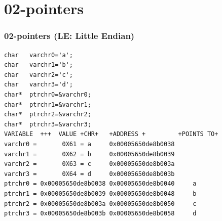 \documentclass[xcolor=table, notheorems, hyperref={pdfpagelabels=false}]{beamer}
\begin{document}
\section{02-pointers}
\begin{frame}[fragile]
\frametitle{02-pointers (LE: Little Endian)}
\begin{lstlisting}[basicstyle=\ttfamily\footnotesize]
char   varchr0='a';
char   varchr1='b';
char   varchr2='c';
char   varchr3='d';
char*  ptrchr0=&varchr0;
char*  ptrchr1=&varchr1;
char*  ptrchr2=&varchr2;
char*  ptrchr3=&varchr3;
VARIABLE  +++  VALUE +CHR+   +ADDRESS +         +POINTS TO+ 
varchr0 =       0X61 = a     0x00005650de8b0038
varchr1 =       0X62 = b     0x00005650de8b0039
varchr2 =       0X63 = c     0x00005650de8b003a
varchr3 =       0X64 = d     0x00005650de8b003b
ptrchr0 = 0x00005650de8b0038 0x00005650de8b0040     a
ptrchr1 = 0x00005650de8b0039 0x00005650de8b0048     b
ptrchr2 = 0x00005650de8b003a 0x00005650de8b0050     c
ptrchr3 = 0x00005650de8b003b 0x00005650de8b0058     d
\end{lstlisting}

\begin{minipage}[t]{120mm}
\end{minipage}

\end{frame}
\end{document}
